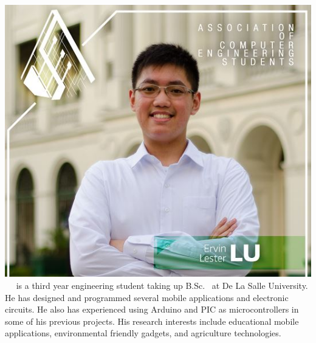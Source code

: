 
\includegraphics[width=0.2\columnwidth]{author3}
 \  \ is a third year engineering student taking up B.Sc. \degree \ at De La Salle University. He has designed and programmed several mobile applications and electronic circuits. He also has experienced using Arduino and PIC as microcontrollers in some of his previous projects. His research interests include educational mobile applications, environmental friendly gadgets, and agriculture technologies.


